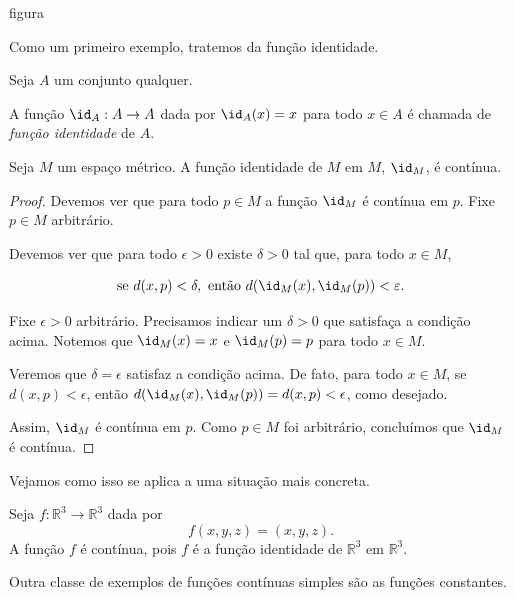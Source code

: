 {figura}

Como um primeiro exemplo, tratemos da função identidade.

\begin{definition}
    Seja $A$ um conjunto qualquer.

    A função $\id_A: A\rightarrow A$ dada por $\id_A(x) = x$ para todo $x \in A$ é chamada de \emph{função identidade} de $A$.
\end{definition}

\begin{proposition}
    Seja $M$ um espaço métrico.
    A função identidade de $M$ em $M$, $\id_M$, é contínua.
\end{proposition}
\begin{proof}
    Devemos ver que para todo $p\in M$ a função $\id_M$ é contínua em $p$.
    Fixe $p\in M$ arbitrário.

    Devemos ver que para todo $\epsilon>0$ existe $\delta>0$ tal que, para todo $x\in M$,

    \[
        \text{se } d(x, p) < \delta, \text{ então } d(\id_M(x), \id_M(p)) < \varepsilon.
    \]

    Fixe $\epsilon>0$ arbitrário.
    Precisamos indicar um $\delta>0$ que satisfaça a condição acima.
    Notemos que $\id_M(x) = x$ e $\id_M(p) = p$ para todo $x\in M$.
    
    Veremos que $\delta = \epsilon$ satisfaz a condição acima.
    De fato, para todo $x \in M$, se $d(x, p) < \epsilon$, então $d(\id_M(x), \id_M(p)) = d(x, p) < \epsilon$, como desejado.

    Assim, $\id_M$ é contínua em $p$.
    Como $p\in M$ foi arbitrário, concluímos que $\id_M$ é contínua.
\end{proof}

Vejamos como isso se aplica a uma situação mais concreta.

\begin{example}
    Seja $f: \mathbb R^3\rightarrow \mathbb R^3$ dada por
    \[
        f(x, y, z) = (x, y, z).
    \]
    A função $f$ é contínua, pois $f$ é a função identidade de $\mathbb R^3$ em $\mathbb R^3$.
\end{example}


Outra classe de exemplos de funções contínuas simples são as funções constantes.

